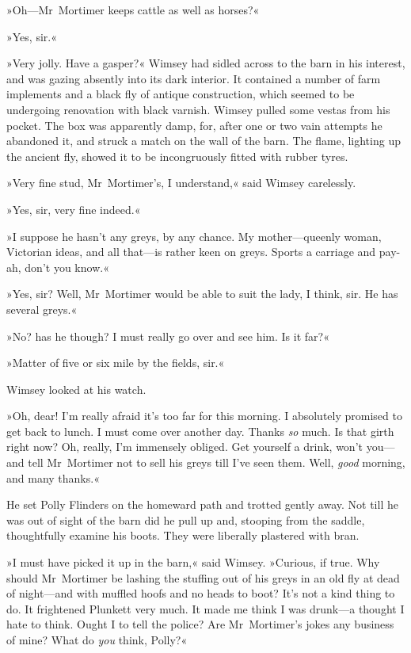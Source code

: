 »Oh—Mr~Mortimer keeps cattle as well as horses?«

»Yes, sir.«

»Very jolly. Have a gasper?« Wimsey had sidled across to the barn in his interest, and was gazing absently into its dark interior. It contained a number of farm implements and a black fly of antique construction, which seemed to be undergoing renovation with black varnish. Wimsey pulled some vestas from his pocket. The box was apparently damp, for, after one or two vain attempts he abandoned it, and struck a match on the wall of the barn. The flame, lighting up the ancient fly, showed it to be incongruously fitted with rubber tyres.

»Very fine stud, Mr~Mortimer's, I understand,« said Wimsey carelessly.

»Yes, sir, very fine indeed.«

»I suppose he hasn't any greys, by any chance. My mother—queenly woman, Victorian ideas, and all that—is rather keen on greys. Sports a carriage and pay-ah, don't you know.«

»Yes, sir? Well, Mr~Mortimer would be able to suit the lady, I think, sir. He has several greys.«

»No? has he though? I must really go over and see him. Is it far?«

»Matter of five or six mile by the fields, sir.«

Wimsey looked at his watch.

»Oh, dear! I'm really afraid it's too far for this morning. I absolutely promised to get back to lunch. I must come over another day. Thanks \textit{so} much. Is that girth right now? Oh, really, I'm immensely obliged. Get yourself a drink, won't you—and tell Mr~Mortimer not to sell his greys till I've seen them. Well, \textit{good} morning, and many thanks.«

He set Polly Flinders on the homeward path and trotted gently away. Not till he was out of sight of the barn did he pull up and, stooping from the saddle, thoughtfully examine his boots. They were liberally plastered with bran.

»I must have picked it up in the barn,« said Wimsey. »Curious, if true. Why should Mr~Mortimer be lashing the stuffing out of his greys in an old fly at dead of night—and with muffled hoofs and no heads to boot? It's not a kind thing to do. It frightened Plunkett very much. It made me think I was drunk—a thought I hate to think. Ought I to tell the police? Are Mr~Mortimer's jokes any business of mine? What do \textit{you} think, Polly?«

